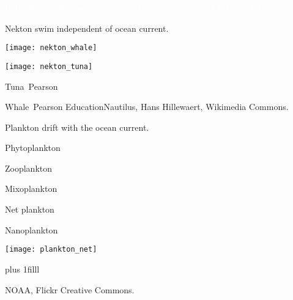 \documentclass[t,handout]{beamer}  %
\begin{document}

{
\begin{frame}[b]
\tiny\textcolor{white}{Betty White, Wikimedia Commons\hfill Public domain, NOAA Photo Library}
\end{frame}
}


\begin{frame}[t]{Nekton swim independent of ocean current.}
	\vspace*{-\baselineskip}
	
	\begin{multicols}{2}
		\hangpara{}
		
		\hangpara{}

		\vfill
		
		\texttt{[image: nekton\_whale]}
	
	\columnbreak
	
		\texttt{[image: nekton\_tuna]}

		
	\end{multicols}

\tiny \hfill Tuna \textcopyright\,Pearson

\tiny Whale \textcopyright\,Pearson Education\hfill Nautilus, Hans Hillewaert, Wikimedia Commons.
\end{frame}

\begin{frame}[t]{Plankton drift with the ocean current.}
	\vspace*{-\baselineskip}
	
	\begin{multicols}{2}
		\hangpara Phytoplankton
		
		\hangpara Zooplankton

		\hangpara Mixoplankton

		\vspace*{\baselineskip}
		
		\hangpara Net plankton

		\hangpara Nanoplankton
	
	\columnbreak
	
		\hangpara{}

		\hangpara{}
		
		\vspace*{\baselineskip}
		
		\texttt{[image: plankton\_net]}

	\end{multicols}

\vskip0pt plus 1filll

\hfill\tiny NOAA, Flickr Creative Commons.
\end{frame}
\end{document}
